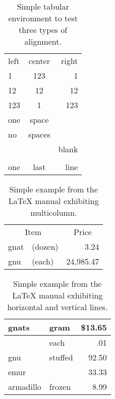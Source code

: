 \documentclass{article}
\begin{document}
\begin{table}
\begin{center}
\begin{tabular}{lcr}
left & center & right \\
1 & 123 & 1 \\
12 & 12 & 12 \\
123 & 1 & 123 \\
one & space & \\
no & spaces &\\
&& blank\\
&&\\
one & last & line
\end{tabular}
\caption{Simple tabular environment to test three types of alignment.}
\end{center}
\end{table}

\begin{table}
\begin{center}
\begin{tabular}{llr}
\multicolumn{2}{c}{Item} & \multicolumn{1}{c}{Price} \\
gnat      & (dozen)  & 3.24\\
gnu       & (each)   & 24,985.47 
\end{tabular}
\caption{Simple example from the \LaTeX{} manual exhibiting multicolumn.}
\end{center}
\end{table}

\begin{table}
\begin{center}
\begin{tabular}{||l|lr||}
\hline
gnats     & gram    & \$13.65 \\
\hline
          & each    &     .01 \\
\hline
gnu       & stuffed &   92.50 \\
\cline{1-1} \cline{3-3}
emur      &         &   33.33 \\
armadillo & frozen  &    8.99 \\
\hline
\end{tabular}
\caption{Simple example from the \LaTeX{} manual exhibiting horizontal
and vertical lines.}
\end{center}
\end{table}
\end{document}
